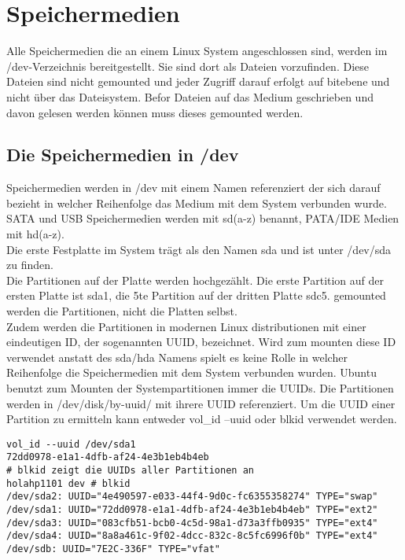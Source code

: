 \section{Speichermedien}
Alle Speichermedien die an einem Linux System angeschlossen sind, werden im /dev-Verzeichnis bereitgestellt. Sie sind dort als Dateien vorzufinden. Diese Dateien sind nicht gemounted und jeder Zugriff darauf erfolgt auf bitebene und nicht \"uber das Dateisystem. Befor Dateien auf das Medium geschrieben und davon gelesen werden k\"onnen muss dieses gemounted werden.\\
\subsection{Die Speichermedien in /dev}
Speichermedien werden in /dev mit einem Namen referenziert der sich darauf bezieht in welcher Reihenfolge das Medium mit dem System verbunden wurde.
SATA und USB Speichermedien werden mit sd(a-z) benannt, PATA/IDE Medien mit hd(a-z).\\
Die erste Festplatte im System tr\"agt als den Namen sda und ist unter /dev/sda zu finden.\\
Die Partitionen auf der Platte werden hochgez\"ahlt. Die erste Partition auf der ersten Platte ist sda1, die 5te Partition auf der dritten Platte sdc5. gemounted werden die Partitionen, nicht die Platten selbst.\\
Zudem werden die Partitionen in modernen Linux distributionen mit einer eindeutigen ID, der sogenannten UUID, bezeichnet. Wird zum mounten diese ID verwendet anstatt des sda/hda Namens spielt es keine Rolle in welcher Reihenfolge die Speichermedien mit dem System verbunden wurden. Ubuntu benutzt zum Mounten der Systempartitionen immer die UUIDs. Die Partitionen werden in /dev/disk/by-uuid/ mit ihrere UUID referenziert. Um die UUID einer Partition zu ermitteln kann entweder vol\_id --uuid oder blkid verwendet werden.
\begin{lstlisting}
vol_id --uuid /dev/sda1
72dd0978-e1a1-4dfb-af24-4e3b1eb4b4eb
# blkid zeigt die UUIDs aller Partitionen an
holahp1101 dev # blkid 
/dev/sda2: UUID="4e490597-e033-44f4-9d0c-fc6355358274" TYPE="swap" 
/dev/sda1: UUID="72dd0978-e1a1-4dfb-af24-4e3b1eb4b4eb" TYPE="ext2" 
/dev/sda3: UUID="083cfb51-bcb0-4c5d-98a1-d73a3ffb0935" TYPE="ext4" 
/dev/sda4: UUID="8a8a461c-9f02-4dcc-832c-8c5fc6996f0b" TYPE="ext4" 
/dev/sdb: UUID="7E2C-336F" TYPE="vfat" 
\end{lstlisting}
